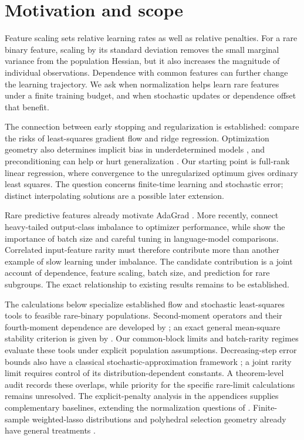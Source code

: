 \section{Motivation and scope}

Feature scaling sets relative learning rates as well as relative penalties. For
a rare binary feature, scaling by its standard deviation removes the small
marginal variance from the population Hessian, but it also increases the
magnitude of individual observations. Dependence with common features can
further change the learning trajectory. We ask when normalization helps learn
rare features under a finite training budget, and when stochastic updates or
dependence offset that benefit.

The connection between early stopping and regularization is established:
\citet{ali2019early} compare the risks of least-squares gradient flow and ridge
regression. Optimization geometry also determines implicit bias in
underdetermined models \citep{gunasekar2018geometry}, and preconditioning can
help or hurt generalization \citep{amari2020preconditioning}. Our starting point
is full-rank linear regression, where convergence to the unregularized optimum
gives ordinary least squares. The question concerns finite-time learning and
stochastic error; distinct interpolating solutions are a possible later
extension.

Rare predictive features already motivate AdaGrad \citep{duchi2011adaptive}.
More recently, \citet{kunstner2024imbalance} connect heavy-tailed output-class
imbalance to optimizer performance, while \citet{sreckovic2025batch} show the
importance of batch size and careful tuning in language-model comparisons.
Correlated input-feature rarity must therefore contribute more than another
example of slow learning under imbalance. The candidate contribution is a joint
account of dependence, feature scaling, batch size, and prediction for rare
subgroups. The exact relationship to existing results remains to be established.

The calculations below specialize established flow and stochastic least-squares
tools to feasible rare-binary populations. Second-moment operators and their
fourth-moment dependence are developed by \citet{defossez2015averaged,
jain2018parallelizing}; an exact general mean-square stability criterion is
given by \citet{mulayoff2024exact}. Our common-block limits and batch-rarity
regimes evaluate these tools under explicit population assumptions.
Decreasing-step error bounds also have a classical stochastic-approximation
framework \citep{moulines2011nonasymptotic}; a joint rarity limit requires
control of its distribution-dependent constants. A theorem-level audit records
these overlaps, while priority for the specific rare-limit calculations remains
unresolved. The explicit-penalty analysis in the appendices supplies
complementary baselines, extending the normalization questions of
\citet{larsson2025normalization}. Finite-sample weighted-lasso distributions and
polyhedral selection geometry already have general treatments
\citep{ewald2020distribution, lee2016exact}.

